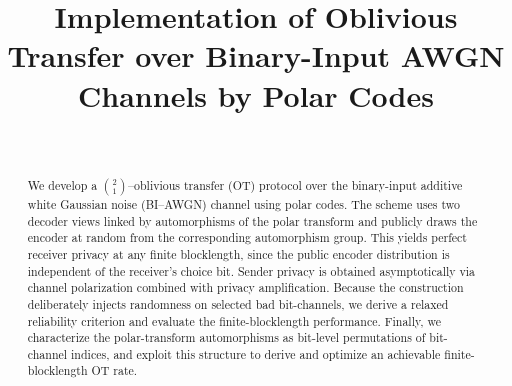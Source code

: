 \documentclass[onecolumn]{IEEEtran} %
\newcommand{\1}{\mathbbm{1}}
\theoremstyle{boldremark}
\begin{document}
\title{Implementation of Oblivious Transfer over Binary-Input AWGN Channels by Polar Codes \\
}



\author{
\\
}

\maketitle

\tableofcontents


\begin{abstract}
We develop a $\binom{2}{1}$--oblivious transfer (OT) protocol over the binary-input additive white Gaussian noise (BI–AWGN) channel using polar codes. The scheme uses two decoder views linked by automorphisms of the polar transform and publicly draws the encoder at random from the corresponding automorphism group. This yields perfect receiver privacy at any finite blocklength, since the public encoder distribution is independent of the receiver’s choice bit. Sender privacy is obtained asymptotically via channel polarization combined with privacy amplification. Because the construction deliberately injects randomness on selected bad bit-channels, we derive a relaxed reliability criterion and evaluate the finite-blocklength performance. Finally, we characterize the polar-transform automorphisms as bit-level permutations of bit-channel indices, and exploit this structure to derive and optimize an achievable finite-blocklength OT rate.
\end{abstract}
\end{document}

